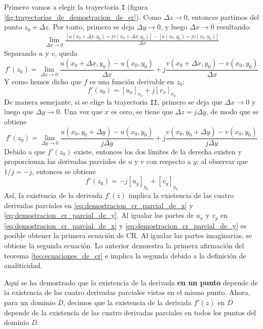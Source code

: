 Primero vamos a elegir la trayectoria \texttt{I} (figura \ref{fig:trayectorias_de_demostracion_de_cr}). Como $\Delta z \to 0$, entonces partimos del punto $z_0+\Delta z$. Por tanto, primero se deja $\Delta y \to 0$, y luego $\Delta x \to 0$ resultando:
\begin{align*}
  \lim_{\Delta x \to 0}\frac{[u(x_0+\Delta x,y_0)+jv(x_0+\Delta x, y_0)]-[u(x_0,y_0)+jv(x_0,y_0)]}{\Delta x}
\end{align*}
Separando $u$ y $v$, queda
\begin{equation*}
  f'(z_0)=\lim_{\Delta x \to 0} \frac{u(x_0+\Delta x,y_0)-u(x_0,y_0)}{\Delta x} + j\frac{v(x_0+\Delta x,y_0)-v(x_0,y_0)}{\Delta x}
\end{equation*}
Y como hemos dicho que $f$ es una función derivable en $z_0$:
\begin{equation}\label{eq:demostracion_cr_parcial_de_x}
  \boxed{f'(z_0)=[u_x]_{x_0} + j[v_x]_{x_0}}
\end{equation}
De manera semejante, si se elige la trayectoria \texttt{II}, primero se deja que $\Delta x \to 0$ y luego que $\Delta y \to 0$. Una vez que $x$ es cero, se tiene que $\Delta z = j\Delta y$, de modo que se obtiene
\begin{equation*}
  f'(z_0) = \lim_{\Delta y \to 0}\frac{u(x_0,y_0+\Delta y)-u(x_0,y_0)}{j\Delta y} + j\frac{v(x_0,y_0+\Delta y)-v(x_0,y_0)}{j\Delta y}
\end{equation*}
Debido a que $f'(z_0)$ existe, entonces los dos límites de la derecha existen y proporcionan las derivadas parciales de $u$ y $v$ con respecto a $y$; al observar que $1/j=-j$, entonces se obtiene
\begin{equation}\label{eq:demostracion_cr_parcial_de_y}
  \boxed{f'(z_0) = -j[u_y]_{y_0} + [v_y]_{y_0}}
\end{equation}
Así, la existencia de la derivada $f'(z)$ implica la existencia de las cuatro derivadas parciales en \ref{eq:demostracion_cr_parcial_de_x} y \ref{eq:demostracion_cr_parcial_de_y}. Al igualar las partes de $u_x$ y $v_y$ en \ref{eq:demostracion_cr_parcial_de_x} y \ref{eq:demostracion_cr_parcial_de_y} es posible obtener la primera ecuación de CR. Al igualar las partes imaginarias, se obtiene la segunda ecuación. Lo anterior demuestra la primera afirmación del teorema \ref{teo:ecuaciones_de_cr} e implica la segunda debido a la definición de analiticidad.

Aquí se ha demostrado que la existencia de la derivada \textbf{en un punto} depende de la existencia de las cuatro derivadas parciales vistas en el mismo punto. Ahora, para un dominio \textit{D}, decimos que la existencia de la derivada $f'(z)$ en $D$ depende de la existencia de las cuatro derivadas parciales en todos los puntos del dominio \textit{D}.

